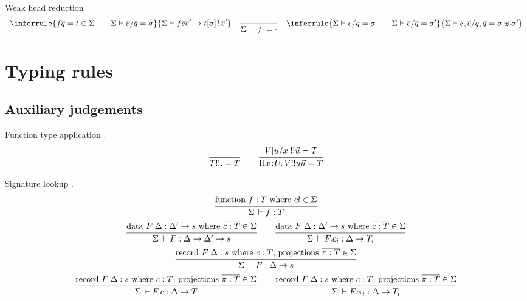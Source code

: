 \documentclass[acmlarge]{acmart}\settopmatter{}
\renewcommand{\|}{\mid}
\begin{document}

Weak head reduction 
\[
\begin{array}{lll}
\inferrule{f \overline q = t \in \Sigma \qquad \Sigma \vdash \overline{e}/\overline{q} = \sigma}
{\Sigma \vdash f \overline{e} \overline{e}' \to t[\sigma] \bang \overline{e}'}
&
\ru{}
{\Sigma \vdash \cdot/\cdot = \cdot} %
&
\inferrule{\Sigma \vdash e/q = \sigma \qquad \Sigma \vdash \overline{e}/\overline{q} = \sigma'}
{\Sigma \vdash e, \overline{e}/q, \overline{q} = \sigma \uplus \sigma'}%
\end{array}
\]


\section{Typing rules}
\label{sec:typing}


\subsection{Auxiliary judgements}

Function type application .
\[
  \ru{}{T !! . = T}
\qquad
  \ru{\subst u x V !! \vec u = T
    }{\funT x U V !! u \vec u = T}
\]


Signature lookup .
\begin{gather*}
  \ru{\funsig \in \Sigma
    }{\Sigma \der f : T}
\\
  \ru{\datasig \in \Sigma
    }{\Sigma \der F : \Delta \to \Delta' \to s}
\qquad
  \ru{\datasig \in \Sigma
    }{\Sigma \der F.c_i : \Delta \to T_i}
\\
  \ru{\recsig \in \Sigma
    }{\Sigma \der F : \Delta \to s}
\\
  \ru{\recsig \in \Sigma
    }{\Sigma \der F.c : \Delta \to T}
\qquad
  \ru{\recsig \in \Sigma
    }{\Sigma \der F.\pi_i : \Delta \to T_i}
\end{gather*}
\end{document}
